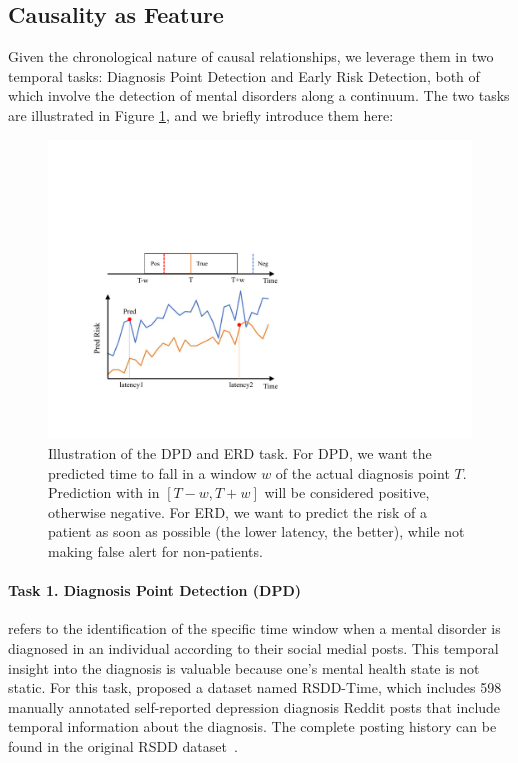\subsection{Causality as Feature}
\label{sec:causal_as_feature}
Given the chronological nature of causal relationships, we leverage them in two temporal tasks: Diagnosis Point Detection and Early Risk Detection, both of which involve the detection of mental disorders along a continuum. The two tasks are illustrated in Figure \ref{fig:tasks}, and we briefly introduce them here:
\begin{figure}[th]
	\centering
	\includegraphics[width=0.9\linewidth]{figures/task_fig.pdf}
	\caption{Illustration of the DPD and ERD task. For DPD, we want the predicted time to fall in a window $w$ of the actual diagnosis point $T$. Prediction with in $[T-w, T+w]$ will be considered positive, otherwise negative. For ERD, we want to predict the risk of a patient as soon as possible (the lower latency, the better), while not making false alert for non-patients.}
	\label{fig:tasks}
\end{figure}

\paragraph{Task 1. Diagnosis Point Detection (DPD)} refers to the identification of the specific time window when a mental disorder is diagnosed in an individual according to their social medial posts. This temporal insight into the diagnosis is valuable because one’s mental health state is not static. 
For this task, \citet{macavaney-etal-2018-rsdd} proposed a dataset named RSDD-Time, which includes 598 manually annotated self-reported depression diagnosis Reddit posts that include temporal information about the diagnosis. The complete posting history can be found in the original RSDD dataset~\cite{yates-etal-2017-depression}.

